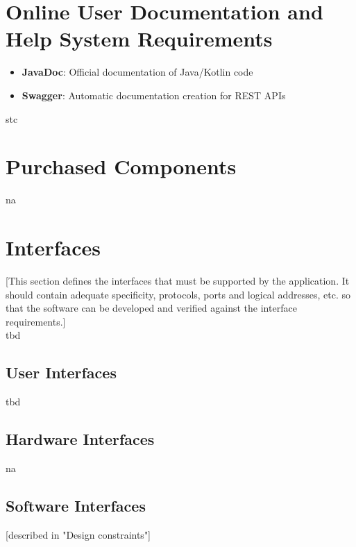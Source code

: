 \documentclass[a4paper,12pt,chapterprefix=false,bibliography=totoc,listof=totoc,]{scrreprt}
\begin{document}
\section{Online User Documentation and Help System Requirements}
\begin{itemize}
	\item \textbf{JavaDoc}: Official documentation of Java/Kotlin code
	\item \textbf{Swagger}: Automatic documentation creation for REST APIs
\end{itemize}

\gls{stc}

\section{Purchased Components}
\gls{na}

\section{{\color{blue} Interfaces}}
{\color{blue} [This section defines the interfaces that must be supported by the application. It should contain adequate specificity, protocols, ports and logical addresses, etc. so that the software can be developed and verified against the interface requirements.]}\\

\gls{tbd}

\subsection{{\color{blue} User Interfaces}}
\gls{tbd}

\subsection{Hardware Interfaces}
\gls{na}

\subsection{Software Interfaces}
[described in "Design constraints"]
\end{document}
